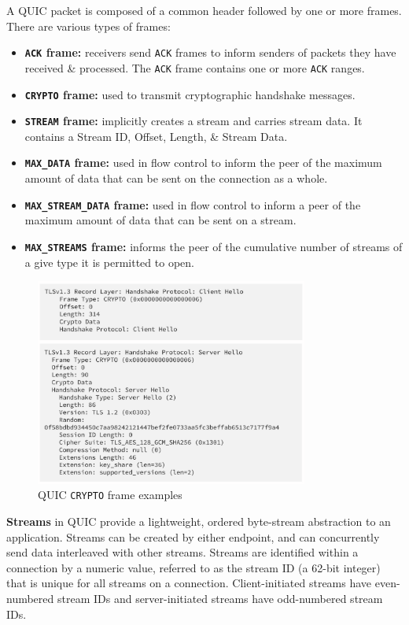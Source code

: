 \documentclass[a4paper,11pt]{article}
\begin{document}
A QUIC packet is composed of a common header followed by one or more frames.
There are various types of frames:
\begin{itemize}
    \item   \textbf{\texttt{ACK} frame:} receivers send \verb|ACK| frames to inform senders of packets they have received \& processed.
            The \verb|ACK| frame contains one or more \verb|ACK| ranges.

    \item   \textbf{\texttt{CRYPTO} frame:} used to transmit cryptographic handshake messages.

    \item   \textbf{\texttt{STREAM} frame:} implicitly creates a stream and carries stream data.
            It contains a Stream ID, Offset, Length, \& Stream Data.

    \item   \textbf{\texttt{MAX\_DATA} frame:} used in flow control to inform the peer of the maximum amount of data that can be sent on the connection as a whole.

    \item   \textbf{\texttt{MAX\_STREAM\_DATA} frame:} used in flow control to inform a peer of the maximum amount of data that can be sent on a stream.

    \item   \textbf{\texttt{MAX\_STREAMS} frame:} informs the peer of the cumulative number of streams of a give type it is permitted to open.
\end{itemize}

\begin{figure}[H]
    \centering
    \includegraphics[width=0.8\textwidth]{./images/quicframes.png}
    \caption{QUIC \texttt{CRYPTO} frame examples}
\end{figure}

\textbf{Streams} in QUIC provide a lightweight, ordered byte-stream abstraction to an application.
Streams can be created by either endpoint, and can concurrently send data interleaved with other streams.
Streams are identified within a connection by a numeric value, referred to as the stream ID (a 62-bit integer) that is unique for all streams on a connection.
Client-initiated streams have even-numbered stream IDs and server-initiated streams have odd-numbered stream IDs.
\end{document}
